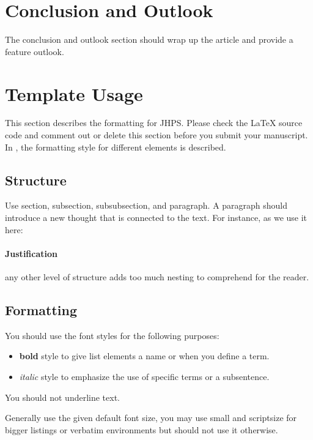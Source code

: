 \documentclass{jhps}
\begin{document}
\section{Conclusion and Outlook} \label{sec:con_out}
The conclusion and outlook section should wrap up the article and provide a feature outlook.

\clearpage

\setcounter{section}{-1}
\section{Template Usage}
\label{sec:usage}

This section describes the formatting for JHPS.
Please check the LaTeX source code and comment out or delete this section before you submit your manuscript.
In , the formatting style for different elements is described.

\subsection{Structure}

Use section, subsection, subsubsection, and paragraph.
A paragraph should introduce a new thought that is connected to the text.
For instance, as we use it here:

\paragraph{Justification} any other level of structure adds too much nesting to comprehend for the reader.

\subsection{Formatting}
You should use the font styles for the following purposes:
\begin{itemize}
  \item \textbf{bold} style to give list elements a name or when you define a term.
  \item \textit{italic} style to emphasize the use of specific terms or a subsentence.
\end{itemize}
You should not underline text.

\medskip

Generally use the given default font size, you may use small and scriptsize for bigger listings or verbatim environments but should not use it otherwise.
\end{document}
